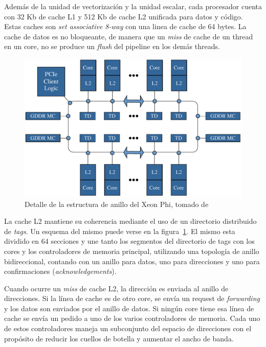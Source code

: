 Adem\'as de la unidad de vectorizaci\'on y la unidad escalar, cada procesador cuenta con 32 Kb de cache L1 y 512 Kb de cache
L2 unificada para datos y c\'odigo. Estas caches son \textit{set associative} \textit{8-way} con una linea de cache de 64 bytes.
La cache de datos es no bloqueante, de manera que un \textit{miss} de cache de un thread en un core,
no se produce un \textit{flush} del pipeline en los dem\'as threads.

\begin{figure}[htbp]
   \centering
   \includegraphics[width=\plotwidth]{images/xeon-phi-ring.pdf}
   \caption{Detalle de la estructura de anillo del Xeon Phi, tomado de~\cite{XeonPhiArchArticle}}
   \label{fig::xeon_phi_arch_ring}
\end{figure}

La cache L2 mantiene su coherencia mediante el uso de un directorio distribuido de \textit{tags}. Un esquema del mismo puede
verse en la figura~\ref{fig::xeon_phi_arch_ring}. El mismo esta dividido en 64 secciones y une tanto los segmentos del
directorio de tags con los cores y los controladores de memoria principal, utilizando una topolog\'ia de anillo bidireccional,
contando con un anillo para datos, uno para direcciones y uno para confirmaciones (\textit{acknowledgements}).

Cuando ocurre un \textit{miss} de cache L2, la direcci\'on es enviada al anillo de direcciones. Si la l\'inea de cache
es de otro core, se env\'ia un request de \textit{forwarding} y los datos son enviados por el anillo de datos. Si ning\'un
core tiene esa l\'inea de cache se env\'ia un pedido a uno de los varios controladores de memoria. Cada uno de estos controladores
maneja un subconjunto del espacio de direcciones con el prop\'osito de reducir los cuellos de botella y aumentar el ancho de banda.

